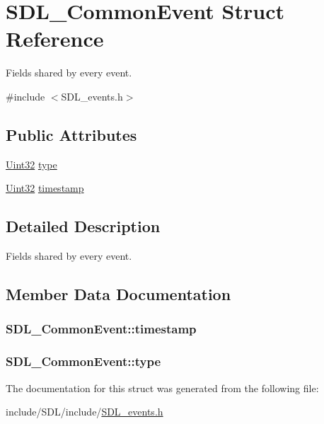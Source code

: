 \hypertarget{struct_s_d_l___common_event}{\section{S\-D\-L\-\_\-\-Common\-Event Struct Reference}
\label{struct_s_d_l___common_event}
}


Fields shared by every event.  




{\ttfamily \#include $<$S\-D\-L\-\_\-events.\-h$>$}

\subsection*{Public Attributes}
\begin{DoxyCompactItemize}
\item 
\hyperlink{_s_d_l__stdinc_8h_add440eff171ea5f55cb00c4a9ab8672d}{Uint32} \hyperlink{struct_s_d_l___common_event_a4ecd888325355321b42b2e2956f27453}{type}
\item 
\hyperlink{_s_d_l__stdinc_8h_add440eff171ea5f55cb00c4a9ab8672d}{Uint32} \hyperlink{struct_s_d_l___common_event_a7d9046abb021ffc88dd5d32978289e65}{timestamp}
\end{DoxyCompactItemize}


\subsection{Detailed Description}
Fields shared by every event. 

\subsection{Member Data Documentation}
\hypertarget{struct_s_d_l___common_event_a7d9046abb021ffc88dd5d32978289e65}{
\subsubsection[{timestamp}]{ S\-D\-L\-\_\-\-Common\-Event\-::timestamp}}\label{struct_s_d_l___common_event_a7d9046abb021ffc88dd5d32978289e65}
\hypertarget{struct_s_d_l___common_event_a4ecd888325355321b42b2e2956f27453}{
\subsubsection[{type}]{ S\-D\-L\-\_\-\-Common\-Event\-::type}}\label{struct_s_d_l___common_event_a4ecd888325355321b42b2e2956f27453}


The documentation for this struct was generated from the following file\-:\begin{DoxyCompactItemize}
\item 
include/\-S\-D\-L/include/\hyperlink{_s_d_l__events_8h}{S\-D\-L\-\_\-events.\-h}\end{DoxyCompactItemize}
